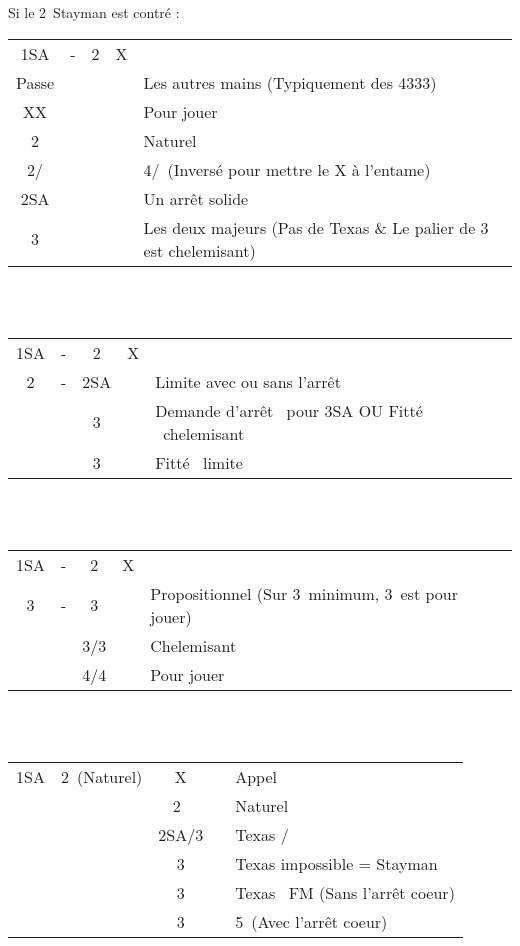 \documentclass[a4paper, oneside, 11pt]{report}
\begin{document}
		Si le 2\trefle\ Stayman est contré :\\
		\begin{tabular}{cccc|l}
		1SA & - & 2\trefle & X &\\
		Passe &&&& Les autres mains (Typiquement des 4333)\\
		XX &&&& Pour jouer\\
		2\carreau &&&& Naturel\\
		2\coeur/\pique &&&& 4\pique/\coeur\ (Inversé pour mettre le X à l'entame)\\
		2SA &&&& Un arrêt solide\\
		3\trefle &&&& Les deux majeurs (Pas de Texas \& Le palier de 3 est chelemisant)\\
		\end{tabular}\\\\

		\begin{tabular}{cccc|l}
		1SA & - & 2\trefle & X &\\
		2\pique & - & 2SA && Limite avec ou sans l'arrêt \trefle\\
		&& 3\trefle && Demande d'arrêt \trefle\ pour 3SA OU Fitté \coeur\ chelemisant\\
		&& 3\coeur && Fitté \coeur\ limite\\
		\end{tabular}\\\\
		
		\begin{tabular}{cccc|l}
		1SA & - & 2\trefle & X &\\
		3\trefle & - & 3\carreau && Propositionnel (Sur 3\coeur\ minimum, 3\pique\ est pour jouer)\\
		&& 3\coeur/3\pique && Chelemisant\\
		&& 4\coeur/4\pique && Pour jouer\\
		\end{tabular}\\\\
		
\newpage
		\begin{tabular}{cccc|l}
		1SA & 2\coeur\ (Naturel) & X && Appel\\
		&& 2\pique\ && Naturel\\
		&& 2SA/3\trefle && Texas \trefle/\carreau\\
		&& 3\carreau && Texas impossible = Stayman\\
		&& 3\coeur && Texas \pique\ FM (Sans l'arrêt coeur)\\
		&& 3\pique && 5\pique\ (Avec l'arrêt coeur)\\
		\end{tabular}\\\\
\end{document}
